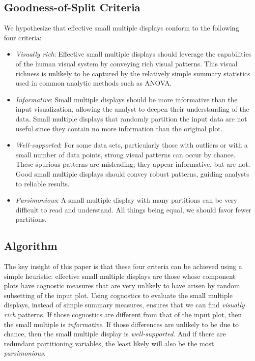 \subsection{Goodness-of-Split Criteria}
We hypothesize that effective small multiple displays conform to the following four criteria:
\begin{itemize}
\item \emph{Visually rich}: Effective small multiple displays should leverage the capabilities of the human visual system by conveying rich visual patterns. This visual richness is unlikely to be captured by the relatively simple summary statistics used in common analytic methods such as ANOVA.

\item \emph{Informative}: Small multiple displays should be more informative than the input visualization, allowing the analyst to deepen their understanding of the data. Small multiple displays that randomly partition the input data are not useful since they contain no more information than the original plot.

\item \emph{Well-supported}: For some data sets, particularly those with outliers or with a small number of data points, strong visual patterns can occur by chance. These spurious patterns are misleading; they appear informative, but are not. Good small multiple displays should convey robust patterns, guiding analysts to reliable results.

\item \emph{Parsimonious}: A small multiple display with many partitions can be very difficult to read and understand. All things being equal, we should favor fewer partitions.
\end{itemize}

\subsection{Algorithm}

The key insight of this paper is that these four criteria can be achieved using a simple heuristic: effective small multiple displays are those whose component plots have cognostic measures that are very unlikely to have arisen by random subsetting of the input plot. Using cognostics to evaluate the small multiple displays, instead of simple summary measures, ensures that we can find \emph{visually rich} patterns. If those cognostics are different from that of the input plot, then the small multiple is \emph{informative}. If those differences are unlikely to be due to chance, then the small multiple display is \emph{well-supported}. And if there are redundant partitioning variables, the least likely will also be the most \emph{parsimonious}. 

